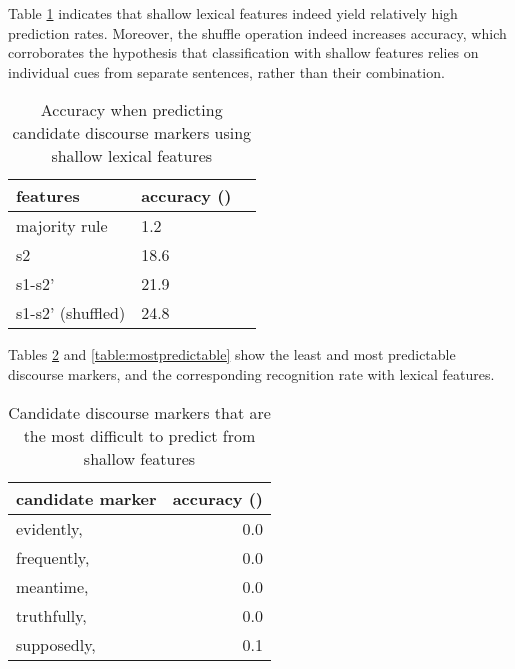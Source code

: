 \documentclass[11pt,a4paper]{article}
\begin{document}
Table \ref{table:resshallowpred} indicates that shallow lexical features indeed yield relatively high prediction rates. Moreover, the shuffle operation indeed increases accuracy, which corroborates the hypothesis that classification with shallow features relies on individual cues from separate sentences, rather than their combination.

\begin{table}[htb]
\begin{center}
\begin{tabular}{lll}
\toprule
features         & accuracy () \\ \midrule
majority rule    & 1.2             \\
s2               & 18.6           \\
s1-s2'            & 21.9         \\    
s1-s2' (shuffled) & 24.8              \\
\bottomrule
\end{tabular}
\end{center}
\caption{Accuracy when predicting candidate discourse markers using shallow lexical features}
\label{table:resshallowpred}
\end{table}


Tables \ref{table:lesspredictable} and \ref{table:mostpredictable} show the least and most predictable discourse markers, and the corresponding recognition rate with lexical features. 

\begin{table}[htb]
\begin{center}
\begin{tabular}{lr}
\toprule
   candidate marker &  accuracy () \\
\midrule
  evidently, &       0.0 \\
 frequently, &       0.0 \\
   meantime, &       0.0 \\
 truthfully, &       0.0 \\
 supposedly, &       0.1 \\
\bottomrule
\end{tabular}
\end{center}
\caption{Candidate discourse markers that are the most difficult to predict from shallow features}
\label{table:lesspredictable}
\end{table}
\end{document}
